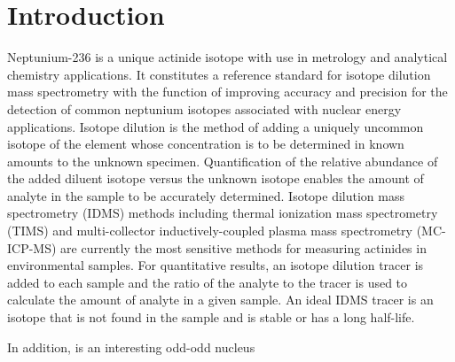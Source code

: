 
\section{\label{sec:intro_U5_d}Introduction}




Neptunium-236 is a unique actinide isotope with  use in metrology and analytical chemistry applications. 
It constitutes a reference standard for isotope dilution mass spectrometry with the function of improving accuracy and precision for the detection of common neptunium isotopes associated with nuclear energy applications.
Isotope dilution is the method of adding a uniquely uncommon isotope of the element whose concentration is to be determined in known amounts to the unknown specimen. 
Quantification of the relative abundance of the added diluent isotope versus the unknown isotope enables the amount of analyte in the sample to be accurately determined. 
Isotope dilution mass spectrometry (IDMS) methods including thermal ionization mass spectrometry (TIMS) and multi-collector inductively-coupled plasma mass spectrometry (MC-ICP-MS) are currently the most sensitive methods for measuring actinides in environmental samples. 
For quantitative results, an isotope dilution tracer is added to each sample and the ratio of the analyte to the tracer is used to calculate the amount of analyte in a given sample. 
An ideal IDMS tracer is an isotope that is not found in the sample and is stable or has a long half-life.




In addition,  is an interesting odd-odd nucleus

